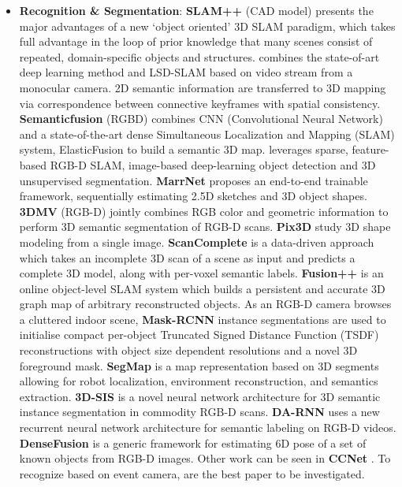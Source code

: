 \documentclass[journal,transmag]{IEEEtran}
\begin{document}
\begin{itemize}
    \item \textbf{Recognition \& Segmentation}: \textbf{SLAM++} (CAD model) \cite{Salas2013SLAM} presents the major advantages of a new ‘object oriented’ 3D SLAM paradigm, which takes full advantage in the loop of prior knowledge that many scenes consist of repeated, domain-specific objects and structures. \cite{Li2016Semi} combines the state-of-art deep learning method and LSD-SLAM based on video stream from a monocular camera. 2D semantic information are transferred to 3D mapping via correspondence between connective keyframes with spatial consistency. \textbf{Semanticfusion} (RGBD) \cite{mccormac2017semanticfusion} combines CNN (Convolutional Neural Network) and a state-of-the-art dense Simultaneous Localization and Mapping (SLAM) system, ElasticFusion \cite{whelan2016elasticfusion} to build a semantic 3D map. \cite{sunderhauf2017meaningful} leverages sparse, feature-based RGB-D SLAM, image-based deep-learning object detection and 3D unsupervised segmentation. \textbf{MarrNet} \cite{wu2017marrnet} proposes an end-to-end trainable framework, sequentially estimating 2.5D sketches and 3D object shapes. \textbf{3DMV} (RGB-D) \cite{dai20183dmv} jointly combines RGB color and geometric information to perform 3D semantic segmentation of RGB-D scans. \textbf{Pix3D} \cite{pix3d} study 3D shape modeling from a single image. \textbf{ScanComplete} \cite{dai2018scancomplete} is a data-driven approach which takes an incomplete 3D scan of a scene as input and predicts a complete 3D model, along with per-voxel semantic labels. \textbf{Fusion++} \cite{McCormac2018FusionVO} is an online object-level SLAM system which builds a persistent and accurate 3D graph map of arbitrary reconstructed objects. As an RGB-D camera browses a cluttered indoor scene, \textbf{Mask-RCNN} instance segmentations are used to initialise compact per-object Truncated Signed Distance Function (TSDF) reconstructions with object size dependent resolutions and a novel 3D foreground mask. \textbf{SegMap} \cite{dube2018segmap} is a map representation based on 3D segments allowing for robot localization, environment reconstruction, and semantics extraction. \textbf{3D-SIS} \cite{hou20193d} is a novel neural network architecture for 3D semantic instance segmentation in commodity RGB-D scans. \textbf{DA-RNN} \cite{xiang2017rnn} uses a new recurrent neural network architecture for semantic labeling on RGB-D videos. \textbf{DenseFusion} \cite{wang2019densefusion} is a generic framework for estimating 6D pose of a set of known objects from RGB-D images. Other work can be seen in \textbf{CCNet} \cite{huang2018ccnet}. To recognize based on event camera, \cite{stromatias2017event}\cite{maro2018event}\cite{afshar2018investigation}\cite{linares2019dynamic} are the best paper to be investigated.

\end{itemize}
\end{document}
